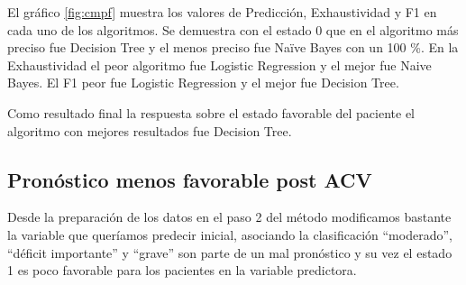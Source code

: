     El gráfico \ref{fig:cmpf} muestra los valores de Predicción, Exhaustividad y F1 en cada
uno de los algoritmos. Se demuestra con el estado 0 que en el algoritmo
más preciso fue Decision Tree y el menos preciso fue Naïve Bayes con un
100 \%. En la Exhaustividad el peor algoritmo fue Logistic Regression y
el mejor fue Naive Bayes. El F1 peor fue Logistic Regression y el mejor
fue Decision Tree.

    Como resultado final la respuesta sobre el estado favorable del paciente
el algoritmo con mejores resultados fue Decision Tree.

    \hypertarget{pronuxf3stico-menos-favorable-post-acv}{%
\subsection{Pronóstico menos favorable post
ACV}\label{pronuxf3stico-menos-favorable-post-acv}}

Desde la preparación de los datos en el paso 2 del método modificamos
bastante la variable que queríamos predecir inicial, asociando la
clasificación ``moderado'', ``déficit importante'' y ``grave'' son parte
de un mal pronóstico y su vez el estado 1 es poco favorable para los
pacientes en la variable predictora.

